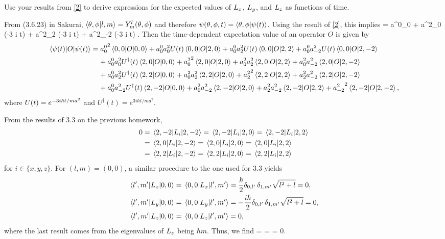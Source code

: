 \newcommand{\Udt}{U^\dagger(t)}

\newcommand{\psit}{\psi(t)}

\begin{problem}
	Use your results from \ref{2} to derive expressions for the expected values of $L_x$, $L_y$, and $L_z$ as functions of time.
\end{problem}

\begin{solution}
	From (3.6.23) in Sakurai, $\braket{\theta, \phi}{l, m} = Y^l_m(\theta, \phi)$ and therefore $\psitpt = \braket{\tp}{\psit}$.  Using the result of \ref{2}, this implies
	\beq
		\ket{\psit} = a^0_0  + a^2_0 \exp(-3 i  t)  + a^2_2 \exp(-3 i  t)  + a^2_{-2} \exp(-3 i  t) .
	\eeq
	Then the time-dependent expectation value of an operator $O$ is given by
	\begin{align*}
		\ev{O}{\psit} &= {a^0_0}^2 \ev{O}{0, 0} + a^0_0 a^2_0 \Ut \mel{0, 0}{O}{2, 0} + a^0_0 a^2_2 \Ut \mel{0, 0}{O}{2, 2} + a^0_0 a^2_{-2} \Ut \mel{0, 0}{O}{2, -2} \\
		&\phantom{=\ } + a^0_0 a^2_0 \Udt \mel{2, 0}{O}{0, 0} + {a^2_0}^2 \ev{O}{2, 0} + a^2_0 a^2_2 \mel{2, 0}{O}{2, 2} + a^2_0 a^2_{-2} \mel{2, 0}{O}{2, -2} \\
		&\phantom{=\ } + a^0_0 a^2_2 \Udt \mel{2, 2}{O}{0, 0} + a^2_0 a^2_2 \mel{2, 2}{O}{2, 0} + {a^2_2}^2 \ev{O}{2, 2} + a^2_2 a^2_{-2} \mel{2, 2}{O}{2, -2} \\
		&\phantom{=\ } + a^0_0 a^2_{-2} \Udt \mel{2, -2}{O}{0, 0} + a^2_0 a^2_{-2} \mel{2, -2}{O}{2, 0} + a^2_2 a^2_{-2} \mel{2, -2}{O}{2, 2} + {a^2_{-2}}^2 \ev{O}{2, -2},
	\end{align*}
	where $U(t) = e^{-3i \hbar t / m a^2}$ and $\Udt = e^{3i \hbar t / m a^2}$.
	
	From the results of 3.3 on the previous homework,
	\begin{align*}
		0 &= \mel{2, -2}{L_i}{2, -2} = \mel{2, -2}{L_i}{2, 0} = \mel{2, -2}{L_i}{2, 2} \\
		&= \mel{2, 0}{L_i}{2, -2} = \mel{2, 0}{L_i}{2, 0} = \mel{2, 0}{L_i}{2, 2} \\
		&= \mel{2, 2}{L_i}{2, -2} = \mel{2, 2}{L_i}{2, 0} = \mel{2, 2}{L_i}{2, 2}
	\end{align*}
	for $i \in \{ x, y, z \}$.  For $(l, m) = (0, 0)$, a similar procedure to the one used for 3.3 yields
	\begin{align*}
		\mel{l', m'}{L_x}{0, 0} &= \mel{0, 0}{L_x}{l', m'} = \frac{\hbar}{2} \delta_{0, l'} \, \delta_{1, m'} \sqrt{l^2 + l} = 0, \\
		\mel{l', m'}{L_y}{0, 0} &= \mel{0, 0}{L_y}{l', m'} = -\frac{i \hbar}{2} \delta_{0, l'} \, \delta_{1, m'} \sqrt{l^2 + l} = 0, \\
		\mel{l', m'}{L_z}{0, 0} &= \mel{0, 0}{L_z}{l', m'} = 0,
	\end{align*}
	where the last result comes from the eigenvalues of $L_z$ being $\hbar m$.  Thus, we find
	\beq
		\ev{\Lx}{\psit} = \ev{\Ly}{\psit} = \ev{\Lz}{\psit} = 0.
	\eeq
\end{solution}